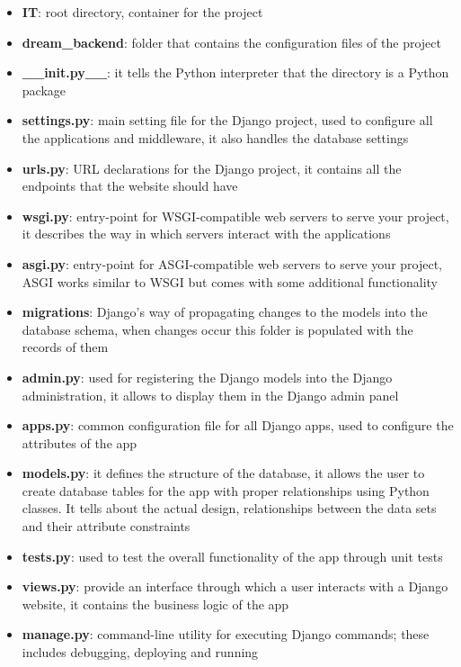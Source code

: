 \documentclass[table, 12pt]{article}
\begin{document}
\begin{itemize}
    \item \textbf{IT}: root directory, container for the project
    \item \textbf{dream\_backend}: folder that contains the configuration files of the project
    \item \textbf{\_\_init.py\_\_}: it tells the Python interpreter that the directory is a Python package
    \item \textbf{settings.py}: main setting file for the Django project, used to configure all the applications and middleware, it also handles the database settings
    \item \textbf{urls.py}: URL declarations for the Django project, it contains all the endpoints that the website should have
    \item \textbf{wsgi.py}: entry-point for WSGI-compatible web servers to serve your project, it describes the way in which servers interact with the applications
    \item \textbf{asgi.py}: entry-point for ASGI-compatible web servers to serve your project, ASGI works similar to WSGI but comes with some additional functionality
    \item \textbf{migrations}: Django's way of propagating changes to the models into the database schema, when changes occur this folder is populated with the records of them
    \item \textbf{admin.py}: used for registering the Django models into the Django administration, it allows to display them in the Django admin panel
    \item \textbf{apps.py}: common configuration file for all Django apps, used to configure the attributes of the app
    \item \textbf{models.py}: it defines the structure of the database, it allows the user to create database tables for the app with proper relationships using Python classes. It tells about the actual design, relationships between the data sets and their attribute constraints
    \item \textbf{tests.py}: used to test the overall functionality of the app through unit tests
    \item \textbf{views.py}: provide an interface through which a user interacts with a Django website, it contains the business logic of the app
    \item \textbf{manage.py}: command-line utility for executing Django commands; these includes debugging, deploying and running
\end{itemize}
\end{document}
